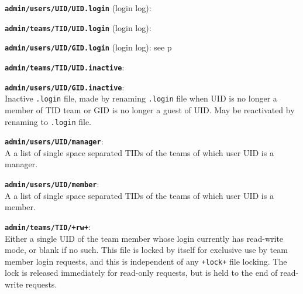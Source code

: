\documentclass[12pt]{article}
\newenvironment{indpar}[1][0.4in]%
	{\begin{list}{}%
		     {\setlength{\itemsep}{0in}%
		      \setlength{\topsep}{0in}%
		      \setlength{\parsep}{1ex}%
		      \setlength{\labelwidth}{#1}%
		      \setlength{\leftmargin}{#1}%
		      \addtolength{\leftmargin}{\labelsep}}%
	 \item}%
	{\end{list}}
\newenvironment{itemlist}[1][0.2in]%
	{\begin{list}{}{\setlength{\labelwidth}{#1}%
		        \setlength{\leftmargin}{\labelwidth}%
		        \addtolength{\leftmargin}{+0.2in}%
		        \addtolength{\linewidth}{-\labelwidth}%
		        \addtolength{\linewidth}{-0.2in}%
		        \renewcommand{\makelabel}[1]{##1\hfill}}
	 \raggedright}%
	{\end{list}}
\newcommand{\TT}[1]{{\tt \bfseries #1}}
\newcommand{\pagref}[1]{p\pageref{#1}}
\begin{document}
\begin{indpar}
\begin{itemlist}
\item[\TT{admin/users/UID/UID.login} (login log):]
\item[\TT{admin/teams/TID/UID.login} (login log):]\vspace*{-1ex}
\item[\TT{admin/users/UID/GID.login} (login log):]\vspace*{-1ex}
see \pagref{ADMIN/USERS/XID/YID.LOGIN}

\item[\TT{admin/teams/TID/UID.inactive}:]
\item[\TT{admin/users/UID/GID.inactive}:]\vspace*{-1ex} ~
\label{ADMIN/USERS/XID/YID.INACTIVE} \\
Inactive {\tt .login} file, made by renaming {\tt .login} file
when UID is no longer a member of TID team or GID is no longer
a guest of UID.  May be reactivated by renaming to {\tt .login}
file.

\item[\TT{admin/users/UID/manager}:] ~
\label{ADMIN/USERS/UID/MANAGER} \\
A a list of single space separated TIDs of the teams of which
user UID is a manager.

\item[\TT{admin/users/UID/member}:] ~
\label{ADMIN/USERS/UID/MEMBER} \\
A a list of single space separated TIDs of the teams of which
user UID is a member.

\item[\TT{admin/teams/TID/+rw+}:] ~
\label{ADMIN/TEAMS/TID/RW} \\
Either a single UID of the team member whose login currently
has read-write mode, or blank if no such.  This file is locked
by itself for exclusive use by team member login requests,
and this is independent of any {\tt +lock+} file locking.
The lock is released immediately for read-only requests, but
is held to the end of read-write requests.



\end{itemlist}
\end{indpar}
\end{document}
